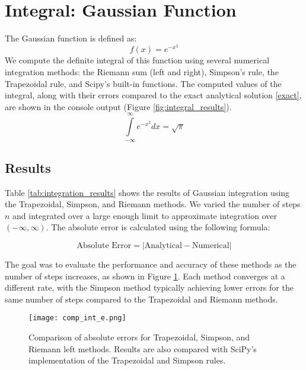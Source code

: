 \documentclass[twocolumn, 11pt]{article}
\begin{document}
\section{Integral: Gaussian Function}
The Gaussian function is defined as:
\begin{equation}
f(x) = e^{-x^2}
\end{equation}
We compute the definite integral of this function using several numerical integration methods: the Riemann sum (left and right), Simpson’s rule, the Trapezoidal rule, and Scipy’s built-in functions. The computed values of the integral, along with their errors compared to the exact analytical solution \eqref{exact}, are shown in the console output (Figure \ref{fig:integral_results}).
\begin{equation}
    \int\limits_{-\infty}^{\infty} e^{-x^2} dx = \sqrt{\pi} \label{exact}
\end{equation}

\subsection{Results}

Table \ref{tab:integration_results} shows the results of Gaussian integration using the Trapezoidal, Simpson, and Riemann methods. We varied the number of steps \(n\) and integrated over a large enough limit to approximate integration over \((- \infty, \infty)\). The absolute error is calculated using the following formula:

\begin{equation}
    \text{Absolute Error} = |\text{Analytical} - \text{Numerical}| \label{error}
\end{equation}

The goal was to evaluate the performance and accuracy of these methods as the number of steps increases, as shown in Figure \ref{fig:error_comparison}. Each method converges at a different rate, with the Simpson method typically achieving lower errors for the same number of steps compared to the Trapezoidal and Riemann methods.

\begin{figure}[h!]
    \centering
    \texttt{[image: comp\_int\_e.png]}
    \caption{Comparison of absolute errors for Trapezoidal, Simpson, and Riemann left methods. Results are also compared with SciPy's implementation of the Trapezoidal and Simpson rules.}
    \label{fig:error_comparison}
\end{figure}
\end{document}

